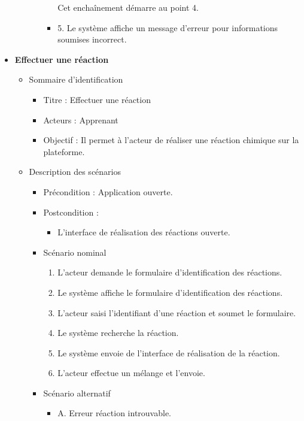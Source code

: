 \begin{itemize}
\begin{itemize}
\begin{itemize}
\begin{itemize}
				                        Cet enchaînement démarre au point 4.

				                  \item 5. Le système affiche un message d’erreur pour informations soumises incorrect.
			                  \end{itemize}
		            \end{itemize}
	      \end{itemize}

	\item \textbf{Effectuer une réaction}
	      \begin{itemize}
		      \item Sommaire d’identification
		            \begin{itemize}
			            \item Titre : Effectuer une réaction
			            \item Acteurs : Apprenant
			            \item Objectif : Il permet à l’acteur de réaliser une réaction chimique sur la plateforme.
		            \end{itemize}
		      \item Description des scénarios
		            \begin{itemize}
			            \item Précondition : Application ouverte.
			            \item Postcondition :
			                  \begin{itemize}
				                  \item L'interface de réalisation des réactions ouverte.
			                  \end{itemize}
			            \item Scénario nominal
			                  \begin{enumerate}
				                  \item L’acteur demande le formulaire d'identification des réactions.
				                  \item Le système affiche le formulaire d'identification des réactions.
				                  \item L’acteur saisi l'identifiant d'une réaction et soumet le formulaire.
				                  \item Le système recherche la réaction.
				                  \item Le système envoie de l'interface de réalisation de la réaction.
				                  \item L’acteur effectue un mélange et l’envoie.
			                  \end{enumerate}
			            \item Scénario alternatif
			                  \begin{itemize}
				                  \item A. Erreur réaction introuvable.


\end{itemize}
\end{itemize}
\end{itemize}
\end{itemize}
